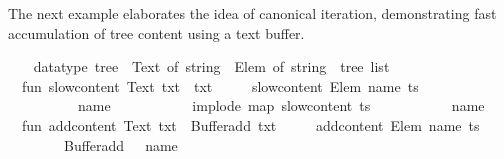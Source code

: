 \begin{isabellebody}
\begin{isamarkuptext}
  \medskip The next example elaborates the idea of canonical
  iteration, demonstrating fast accumulation of tree content using a
  text buffer.%
\end{isamarkuptext}%
\isamarkuptrue%
%
\isadelimML
%
\endisadelimML
%
\isatagML
{}\isamarkupfalse%
\ {}\isanewline
\ \ datatype\ tree\ {}\ Text\ of\ string\ {}\ Elem\ of\ string\ {}\ tree\ list{}\isanewline
\isanewline
\ \ fun\ slow{}content\ {}Text\ txt{}\ {}\ txt\isanewline
\ \ \ \ {}\ slow{}content\ {}Elem\ {}name{}\ ts{}{}\ {}\isanewline
\ \ \ \ \ \ \ \ {}{}{}\ {}\ name\ {}\ {}{}{}\ {}\isanewline
\ \ \ \ \ \ \ \ implode\ {}map\ slow{}content\ ts{}\ {}\isanewline
\ \ \ \ \ \ \ \ {}{}{}{}\ {}\ name\ {}\ {}{}{}\isanewline
\isanewline
\ \ fun\ add{}content\ {}Text\ txt{}\ {}\ Buffer{}add\ txt\isanewline
\ \ \ \ {}\ add{}content\ {}Elem\ {}name{}\ ts{}{}\ {}\isanewline
\ \ \ \ \ \ \ \ Buffer{}add\ {}{}{}{}\ {}\ name\ {}\ {}{}{}{}\ {}{}\isanewline

\end{isabellebody}
